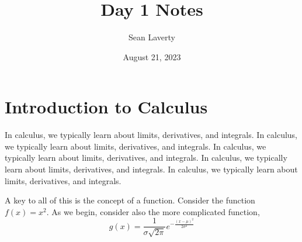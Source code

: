 \documentclass{article}
\title{Day 1 Notes}
\author{Sean Laverty}
\date{August 21, 2023}
\begin{document}
\maketitle %
\newpage

\section{Introduction to Calculus}
In calculus, we typically learn about limits, derivatives, and integrals. In calculus, we typically learn about limits, derivatives, and integrals. In calculus, we typically learn about limits, derivatives, and integrals. In calculus, we typically learn about limits, derivatives, and integrals. In calculus, we typically learn about limits, derivatives, and integrals. 

A key to all of this is the concept of a function. Consider the function \(f(x) = x^2\).
As we begin, consider also the more complicated function, \[g(x) = \frac{1}{\sigma\sqrt{2\pi}}e^{-\frac{(x-\mu)^2}{2\sigma^2}}\]
\end{document}
